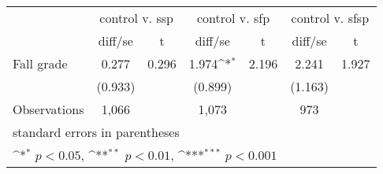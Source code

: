 {
\def\sym#1{\ifmmode^{#1}\else\(^{#1}\)\fi}
\begin{tabular}{l*{3}{cc}}
\hline\hline
                &\multicolumn{2}{c}{control v. ssp}&\multicolumn{2}{c}{control v. sfp}&\multicolumn{2}{c}{control v. sfsp}\\
                &  diff/se         &        t&  diff/se         &        t&  diff/se         &        t\\
\hline
Fall grade      &    0.277         &    0.296&    1.974\sym{*}  &    2.196&    2.241         &    1.927\\
                &  (0.933)         &         &  (0.899)         &         &  (1.163)         &         \\
\hline
Observations    &    1,066         &         &    1,073         &         &      973         &         \\
\hline\hline
\multicolumn{7}{l}{\footnotesize standard errors in parentheses}\\
\multicolumn{7}{l}{\footnotesize \sym{*} \(p<0.05\), \sym{**} \(p<0.01\), \sym{***} \(p<0.001\)}\\
\end{tabular}
}

